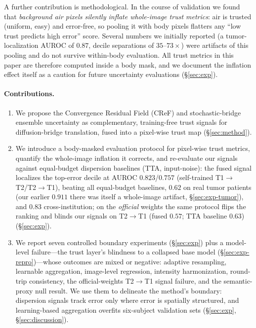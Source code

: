 \documentclass[11pt]{article}
\newcommand{\cref}{Convergence Residual Field (CReF)}
\newcommand{\TrustMap}{trust map}
\begin{document}
A further contribution is methodological. In the course of validation we found
that \emph{background air pixels silently inflate whole-image trust metrics}:
air is trusted (uniform, easy) and error-free, so pooling it with body pixels
flatters any ``low trust predicts high error'' score. Several numbers we
initially reported (a tumor-localization AUROC of $0.87$, decile separations
of $35$--$73\times$) were artifacts of this pooling and do not survive
within-body evaluation. All trust metrics in this paper are therefore computed
inside a body mask, and we document the inflation effect itself as a caution
for future uncertainty evaluations (\S\ref{sec:exp}).

\paragraph{Contributions.}
\begin{enumerate}
  \item We propose the \cref{} and stochastic-bridge ensemble uncertainty as
        complementary, training-free trust signals for diffusion-bridge
        translation, fused into a pixel-wise \TrustMap{} (\S\ref{sec:method}).
  \item We introduce a body-masked evaluation protocol for pixel-wise trust
        metrics, quantify the whole-image inflation it corrects, and re-evaluate
        our signals against equal-budget dispersion baselines (TTA,
        input-noise): the fused signal localizes the top-error decile at AUROC
        $0.823$/$0.757$ (self-trained T1$\to$T2/T2$\to$T1), beating all
        equal-budget baselines, $0.62$ on real tumor patients (our earlier
        $0.911$ there was itself a whole-image artifact, \S\ref{sec:exp-tumor}),
        and $0.83$ cross-institution; on the \emph{official} weights the same protocol
        flips the ranking and blinds our signals on T2$\to$T1 (fused
        $0.57$; TTA baseline $0.63$) (\S\ref{sec:exp}).
  \item We report seven controlled boundary experiments (\S\ref{sec:exp})
        plus a model-level failure---the trust layer's blindness to a collapsed
        base model (\S\ref{sec:exp-repro})---whose outcomes are mixed or
        negative: adaptive resampling, learnable aggregation, image-level
        regression, intensity harmonization, round-trip consistency, the
        official-weights T2$\to$T1 signal failure, and the semantic-proxy
        null result. We use them to delineate the method's
        boundary: dispersion signals track error only where error is
        spatially structured, and learning-based aggregation overfits six-subject validation sets
        (\S\ref{sec:exp}, \S\ref{sec:discussion}).
\end{enumerate}
\end{document}
